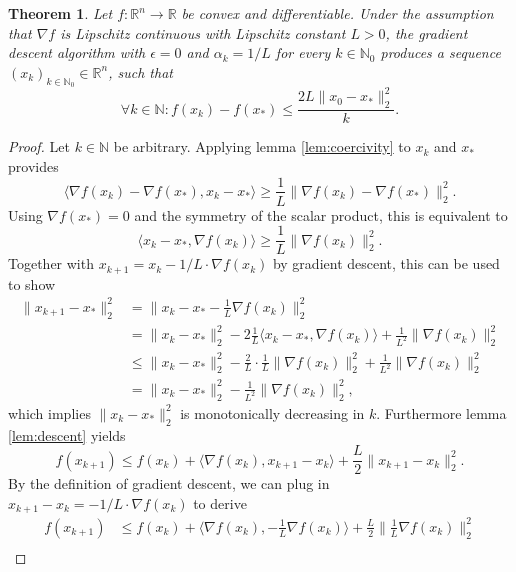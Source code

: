 \documentclass[11pt, a4paper]{article}
\newtheorem{theorem}{Theorem}[section]
\newcommand{\N}{\mathds{N}}
\newcommand{\R}{\mathds{R}}
\begin{document}
\begin{theorem}
Let $f: \R^n \to \R$ be convex and differentiable. Under the assumption that $\nabla f$ is Lipschitz continuous with Lipschitz constant $L>0$, the gradient descent algorithm with $\epsilon = 0$ and $\alpha_k = 1/L$ for every $k \in \N_0$ produces a sequence $(x_k)_{k \in \N_0} \in \R^n$, such that 
\[ \forall k \in \N : f(x_k) - f(x_*) \leq \frac{2L \big \| x_0 - x_* \big \|_2^2 }{k}. \]
\end{theorem}

\begin{proof}
Let $k \in \N$ be arbitrary. Applying lemma \ref{lem:coercivity} to $x_k$ and $x_*$ provides
\[ \big \langle \nabla f(x_k) - \nabla f(x_*), x_k - x_* \big \rangle \ge \frac{1}{L} \big \| \nabla f(x_k) - \nabla f(x_*) \big \|_2^2. \]
Using $\nabla f(x_*) = 0$ and the symmetry of the scalar product, this is equivalent to
\[ \big \langle x_k - x_* ,\nabla f(x_k) \big \rangle \ge \frac{1}{L} \big \| \nabla f(x_k) \big \|_2^2. \]
Together with $x_{k+1} = x_k - 1/L \cdot \nabla f(x_k)$ by gradient descent, this can be used to show
\begin{equation} \begin{split}
\big \| x_{k+1} - x_* \big \|_2^2
&= \big \| x_k - x_* - \frac{1}{L} \nabla f(x_k) \big \|_2^2 \\\
&= \big \| x_k - x_* \big \|_2^2 - 2 \frac{1}{L} \big \langle x_k - x_* , \nabla f(x_k) \big \rangle + \frac{1}{L^2} \big \| \nabla f(x_k) \big \|_2^2 \\\
&\leq \big \| x_k - x_* \big \|_2^2 - \frac{2}{L} \cdot \frac{1}{L} \big \| \nabla f(x_k) \big \|_2^2 + \frac{1}{L^2} \big \| \nabla f(x_k) \big \|_2^2 \\\
& = \big \| x_k - x_* \big \|_2^2 - \frac{1}{L^2} \big \| \nabla f(x_k) \big \|_2^2,
\end{split} \end{equation}
which implies $\big \| x_{k} - x_* \big \|_2^2$ is monotonically decreasing in $k$. Furthermore lemma \ref{lem:descent} yields
\[  f(x_{k+1}) \leq f(x_k) + \big \langle \nabla f(x_k) , x_{k+1} -x_k \big \rangle + \frac{L}{2} \big \| x_{k+1} - x_k \big \|_2^2. \]
By the definition of gradient descent, we can plug in $x_{k+1} - x_k = - 1/L \cdot \nabla f(x_k)$ to derive
\begin{equation} \begin{split} 
f(x_{k+1}) 
&\leq f(x_k) + \big \langle \nabla f(x_k) , - \frac{1}{L} \nabla f(x_k) \big \rangle + \frac{L}{2} \big \| \frac{1}{L} \nabla f(x_k) \big \|_2^2 \\\

\end{split}
\end{equation}
\end{proof}
\end{document}
